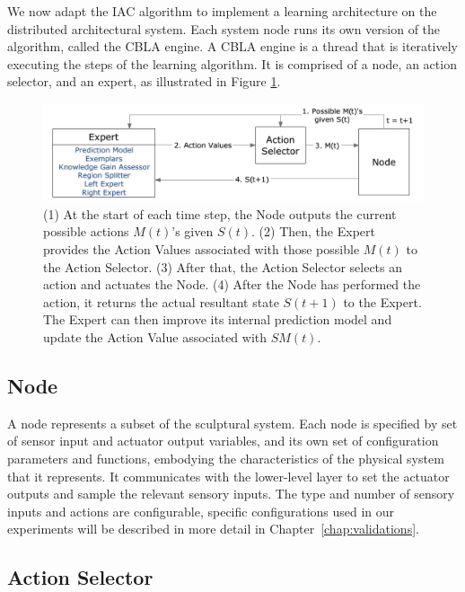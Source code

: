 We now adapt the IAC algorithm \cite{Oudeyer2007} to implement a learning architecture on the distributed architectural system.  Each system node runs its own version of the algorithm, called the CBLA engine.  A CBLA engine is a thread that is iteratively executing the steps of the learning algorithm. It is comprised of a node, an action selector, and an expert, as illustrated in Figure \ref{fig:Block Diagram CBLA}. 

\begin{figure}[htbp]
	\centering
	\includegraphics[width=1.0 \textwidth]{"fig/cbla/Block Diagram CBLA"}
	\caption[Block diagram of the Curiosity Based Learning Algorithm]{(1) At the start of each time step, the Node outputs the current possible actions $M(t)$'s given $S(t)$. (2) Then, the Expert provides the Action Values associated with those possible $M(t)$ to the Action Selector. (3) After that, the Action Selector selects an action and actuates the Node. (4) After the Node has performed the action, it returns the actual resultant state $S(t+1)$ to the Expert. The Expert can then improve its internal prediction model and update the Action Value associated with $SM(t)$. }
	\label{fig:Block Diagram CBLA}
\end{figure}


\FloatBarrier
\subsection{Node}
A node represents a subset of the sculptural system. Each node is specified by set of sensor input and actuator output variables, and its own set of configuration parameters and functions, embodying the characteristics of the physical system that it represents. It communicates with the lower-level layer to set the actuator outputs and sample the relevant sensory inputs.  The type and number of sensory inputs and actions are configurable, specific configurations used in our experiments will be described in more detail in Chapter~\ref{chap:validations}.

\subsection{Action Selector}

